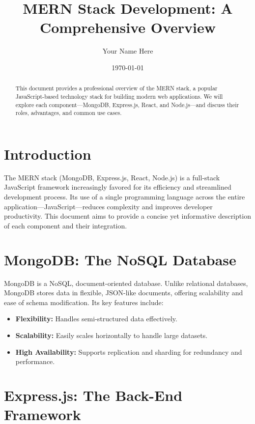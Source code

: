 \documentclass{article}
\title{MERN Stack Development: A Comprehensive Overview}
\author{Your Name Here}
\date{\today}
\begin{document}
\maketitle

\begin{abstract}
This document provides a professional overview of the MERN stack, a popular JavaScript-based technology stack for building modern web applications.  We will explore each component—MongoDB, Express.js, React, and Node.js—and discuss their roles, advantages, and common use cases.
\end{abstract}

\section{Introduction}

The MERN stack (MongoDB, Express.js, React, Node.js) is a full-stack JavaScript framework increasingly favored for its efficiency and streamlined development process.  Its use of a single programming language across the entire application—JavaScript—reduces complexity and improves developer productivity.  This document aims to provide a concise yet informative description of each component and their integration.

\section{MongoDB: The NoSQL Database}

MongoDB is a NoSQL, document-oriented database.  Unlike relational databases, MongoDB stores data in flexible, JSON-like documents, offering scalability and ease of schema modification. Its key features include:

\begin{itemize}
    \item \textbf{Flexibility:}  Handles semi-structured data effectively.
    \item \textbf{Scalability:}  Easily scales horizontally to handle large datasets.
    \item \textbf{High Availability:}  Supports replication and sharding for redundancy and performance.
\end{itemize}

\section{Express.js: The Back-End Framework}
\end{document}

